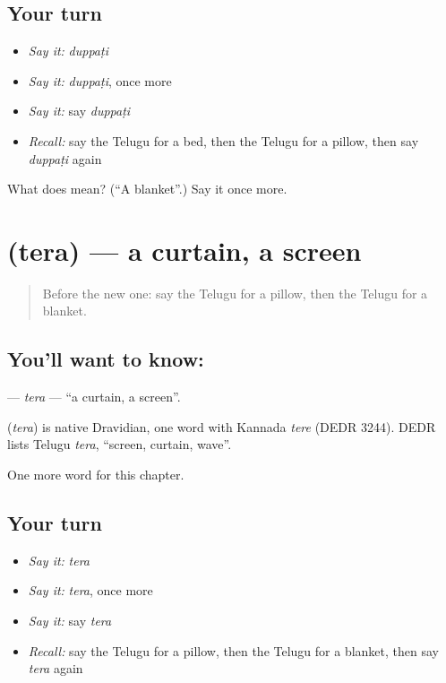 \subsection*{Your turn}
\begin{itemize}
\raggedright
  \item \emph{Say it:} \emph{duppaṭi}
  \item \emph{Say it:} \emph{duppaṭi}, once more
  \item \emph{Say it:} say \emph{duppaṭi}
  \item \emph{Recall:} say the Telugu for a bed, then the Telugu for a pillow, then say \emph{duppaṭi} again
\end{itemize}

\begin{tcolorbox}[breakable,colback=teal!4,colframe=teal!35!black,title={Before you move on}]
What does  mean? (\textquotedblleft{}A blanket\textquotedblright{}.) Say it once more.
\end{tcolorbox}
\section[\texorpdfstring{\te{తెర} (tera)}{తెర (tera)}]{ (tera) — a curtain, a screen}

\label{lesson:TE-C109-tera}



\begin{quote}
Before the new one: say the Telugu for a pillow, then the Telugu for a blanket.
\end{quote}

\subsection*{You'll want to know: }
\textbf{} — \emph{tera} — \textquotedblleft{}a curtain, a screen\textquotedblright{}.

\begin{cousinweb}
\textbf{} (\emph{tera}) is native Dravidian, one word with Kannada \emph{tere} (DEDR 3244). DEDR lists Telugu \emph{tera}, \textquotedblleft{}screen, curtain, wave\textquotedblright{}.
\end{cousinweb}

\begin{grammarlens}[title={What you've built}]
One more word for this chapter.
\end{grammarlens}

\subsection*{Your turn}
\begin{itemize}
\raggedright
  \item \emph{Say it:} \emph{tera}
  \item \emph{Say it:} \emph{tera}, once more
  \item \emph{Say it:} say \emph{tera}
  \item \emph{Recall:} say the Telugu for a pillow, then the Telugu for a blanket, then say \emph{tera} again
\end{itemize}

